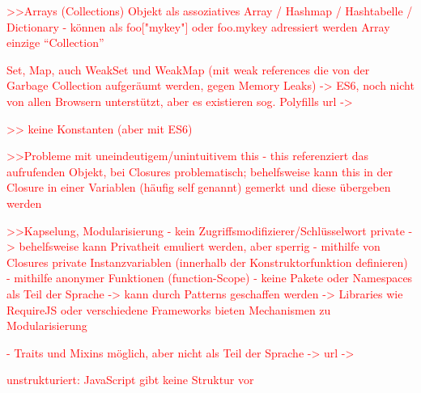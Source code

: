 \documentclass[a4paper, 12pt, hidelinks, listof=totoc, listoftables=totoc, bibliography=totoc]{scrreprt}
\newcommand{\TODO}[1]{\textcolor{red}{#1}\newline}
\begin{document}
\TODO{>>Arrays (Collections)}
\TODO{Objekt als assoziatives Array / Hashmap / Hashtabelle / Dictionary}
\TODO{- können als foo["mykey"] oder foo.mykey adressiert werden}
\TODO{Array einzige "`Collection"'}

\TODO{Set, Map, auch WeakSet und WeakMap (mit weak references die von der Garbage Collection aufgeräumt werden, gegen Memory Leaks) -> ES6, noch nicht von allen Browsern unterstützt, aber es existieren sog. Polyfills }
\TODO{url -> %
}

\TODO{>> keine Konstanten (aber mit ES6)}

\TODO{>>Probleme mit uneindeutigem/unintuitivem this}
\TODO{- this referenziert das aufrufenden Objekt, bei Closures problematisch; behelfsweise kann this in der Closure in einer Variablen (häufig self genannt) gemerkt und diese übergeben werden}

\TODO{>>Kapselung, Modularisierung}
\TODO{- kein Zugriffsmodifizierer/Schlüsselwort private}
\TODO{-> behelfsweise kann Privatheit emuliert werden, aber sperrig}
\TODO{	- mithilfe von Closures private Instanzvariablen (innerhalb der Konstruktorfunktion definieren)}
\TODO{	- mithilfe anonymer Funktionen (function-Scope)}
\TODO{- keine Pakete oder Namespaces als Teil der Sprache}
\TODO{-> kann durch Patterns geschaffen werden}
\TODO{-> Libraries wie RequireJS oder verschiedene Frameworks bieten Mechanismen zu Modularisierung}

\TODO{- Traits und Mixins möglich, aber nicht als Teil der Sprache -> url -> %
}

\TODO{unstrukturiert: JavaScript gibt keine Struktur vor}
\end{document}
